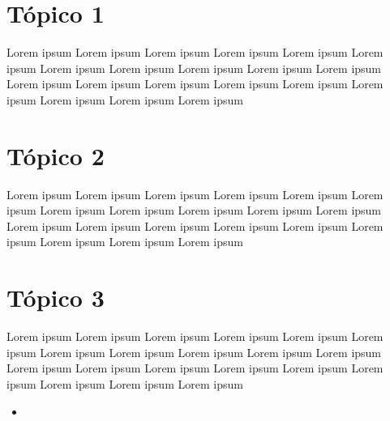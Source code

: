 \documentclass[
]{book}
\providecommand{\tightlist}{%
  \setlength{\itemsep}{0pt}\setlength{\parskip}{0pt}}
\begin{document}
\hypertarget{tuxf3pico-1}{%
\section{Tópico 1}\label{tuxf3pico-1}}

Lorem ipsum Lorem ipsum Lorem ipsum Lorem ipsum Lorem ipsum Lorem ipsum Lorem ipsum Lorem ipsum Lorem ipsum Lorem ipsum Lorem ipsum Lorem ipsum Lorem ipsum Lorem ipsum Lorem ipsum Lorem ipsum Lorem ipsum Lorem ipsum Lorem ipsum Lorem ipsum

\hypertarget{tuxf3pico-2}{%
\section{Tópico 2}\label{tuxf3pico-2}}

Lorem ipsum Lorem ipsum Lorem ipsum Lorem ipsum Lorem ipsum Lorem ipsum Lorem ipsum Lorem ipsum Lorem ipsum Lorem ipsum Lorem ipsum Lorem ipsum Lorem ipsum Lorem ipsum Lorem ipsum Lorem ipsum Lorem ipsum Lorem ipsum Lorem ipsum Lorem ipsum

\hypertarget{tuxf3pico-3}{%
\section{Tópico 3}\label{tuxf3pico-3}}

Lorem ipsum Lorem ipsum Lorem ipsum Lorem ipsum Lorem ipsum Lorem ipsum Lorem ipsum Lorem ipsum Lorem ipsum Lorem ipsum Lorem ipsum Lorem ipsum Lorem ipsum Lorem ipsum Lorem ipsum Lorem ipsum Lorem ipsum Lorem ipsum Lorem ipsum Lorem ipsum

\begin{itemize}
\tightlist
\item
\end{itemize}

  
\end{document}
